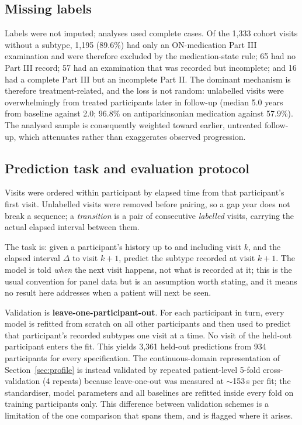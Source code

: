 \documentclass[journal]{IEEEtran}
\begin{document}
\subsection{Missing labels}
Labels were not imputed; analyses used complete cases. Of the 1,333 cohort
visits without a subtype, 1,195 (89.6\%) had only an ON-medication Part III
examination and were therefore excluded by the medication-state rule; 65 had no
Part III record; 57 had an examination that was recorded but incomplete; and 16
had a complete Part III but an incomplete Part II. The dominant mechanism is
therefore treatment-related, and the loss is not random: unlabelled visits were
overwhelmingly from treated participants later in follow-up (median 5.0 years
from baseline against 2.0; 96.8\% on antiparkinsonian medication against
57.9\%). The analysed sample is consequently weighted toward earlier, untreated
follow-up, which attenuates rather than exaggerates observed progression.

\subsection{Prediction task and evaluation protocol}
Visits were ordered within participant by elapsed time from that participant's
first visit. Unlabelled visits were removed before pairing, so a gap year does
not break a sequence; a \emph{transition} is a pair of consecutive \emph{labelled}
visits, carrying the actual elapsed interval between them.

The task is: given a participant's history up to and including visit $k$, and
the elapsed interval $\Delta$ to visit $k+1$, predict the subtype recorded at
visit $k+1$. The model is told \emph{when} the next visit happens, not what is
recorded at it; this is the usual convention for panel data but is an assumption
worth stating, and it means no result here addresses when a patient will next be
seen.

Validation is \textbf{leave-one-participant-out}. For each participant in turn,
every model is refitted from scratch on all other participants and then used to
predict that participant's recorded subtypes one visit at a time. No visit of
the held-out participant enters the fit. This yields 3,361 held-out predictions
from 934 participants for every specification. The continuous-domain
representation of Section~\ref{sec:profile} is instead validated by repeated
patient-level 5-fold cross-validation (4 repeats) because leave-one-out was
measured at $\sim$153\,s per fit; the standardiser, model parameters and all
baselines are refitted inside every fold on training participants only. This
difference between validation schemes is a limitation of the one comparison that
spans them, and is flagged where it arises.
\end{document}
